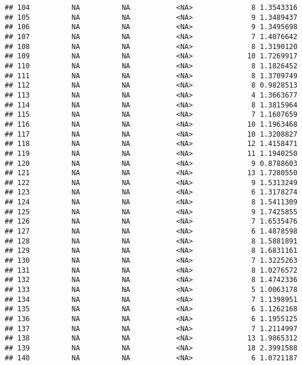 \documentclass[]{article}
\begin{document}
\begin{verbatim}
## 104          NA          NA           <NA>              8 1.3543316
## 105          NA          NA           <NA>              9 1.3489437
## 106          NA          NA           <NA>              9 1.3495698
## 107          NA          NA           <NA>              7 1.4076642
## 108          NA          NA           <NA>              8 1.3190120
## 109          NA          NA           <NA>             10 1.7269917
## 110          NA          NA           <NA>              8 1.1826452
## 111          NA          NA           <NA>              8 1.3709749
## 112          NA          NA           <NA>              8 0.9828513
## 113          NA          NA           <NA>              4 1.3663677
## 114          NA          NA           <NA>              8 1.3815964
## 115          NA          NA           <NA>              7 1.1607659
## 116          NA          NA           <NA>             10 1.1963468
## 117          NA          NA           <NA>             10 1.3208827
## 118          NA          NA           <NA>             12 1.4158471
## 119          NA          NA           <NA>             11 1.1940250
## 120          NA          NA           <NA>              9 0.8788603
## 121          NA          NA           <NA>             13 1.7280550
## 122          NA          NA           <NA>              9 1.5313249
## 123          NA          NA           <NA>              6 1.3178274
## 124          NA          NA           <NA>              8 1.5411309
## 125          NA          NA           <NA>              9 1.7425855
## 126          NA          NA           <NA>              7 1.6535476
## 127          NA          NA           <NA>              6 1.4878598
## 128          NA          NA           <NA>              8 1.5881891
## 129          NA          NA           <NA>              8 1.6831161
## 130          NA          NA           <NA>              7 1.3225263
## 131          NA          NA           <NA>              8 1.0276572
## 132          NA          NA           <NA>              8 1.4742336
## 133          NA          NA           <NA>              5 1.0063178
## 134          NA          NA           <NA>              7 1.1398951
## 135          NA          NA           <NA>              6 1.1262168
## 136          NA          NA           <NA>              6 1.1955125
## 137          NA          NA           <NA>              7 1.2114997
## 138          NA          NA           <NA>             13 1.9865312
## 139          NA          NA           <NA>             18 2.3991588
## 140          NA          NA           <NA>              6 1.0721187

\end{verbatim}
\end{document}
